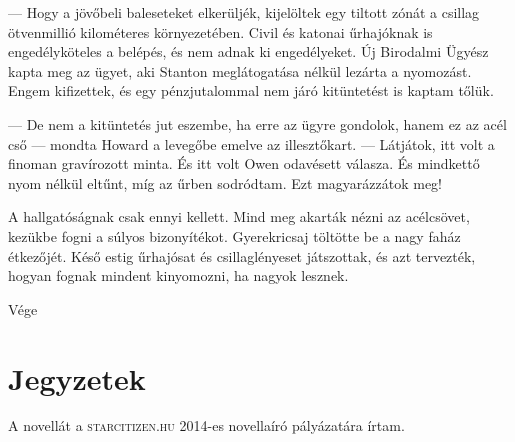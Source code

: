 \documentclass[10pt]{memoir}
\begin{document}
--- Hogy a jövőbeli baleseteket elkerüljék, kijelöltek egy tiltott zónát a
csillag ötvenmillió kilométeres környezetében. Civil és katonai űrhajóknak is
engedélyköteles a belépés, és nem adnak ki engedélyeket. Új Birodalmi Ügyész
kapta meg az ügyet, aki Stanton meglátogatása nélkül lezárta a nyomozást. Engem
kifizettek, és egy pénzjutalommal nem járó kitüntetést is kaptam tőlük.

--- De nem a kitüntetés jut eszembe, ha erre az ügyre gondolok, hanem ez az
acél cső --- mondta Howard a levegőbe emelve az illesztőkart. --- Látjátok, itt
volt a finoman gravírozott minta. És itt volt Owen odavésett válasza. És
mindkettő nyom nélkül eltűnt, míg az űrben sodródtam. Ezt magyarázzátok meg!

A hallgatóságnak csak ennyi kellett. Mind meg akarták nézni az acélcsövet,
kezükbe fogni a súlyos bizonyítékot. Gyerekricsaj töltötte be a nagy faház
étkezőjét. Késő estig űrhajósat és csillaglényeset játszottak, és azt
tervezték, hogyan fognak mindent kinyomozni, ha nagyok lesznek.

\upshape

\begin{center}
Vége
\end{center}

\chapter*{Jegyzetek}

A novellát a \textsc{starcitizen.hu} 2014-es novellaíró pályázatára írtam.
\end{document}
